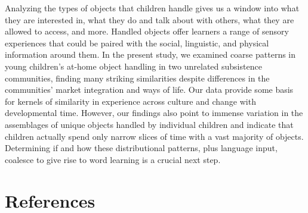 \documentclass[10pt, letterpaper]{article}
\begin{document}
Analyzing the types of objects that children handle gives us a window
into what they are interested in, what they do and talk about with
others, what they are allowed to access, and more. Handled objects offer
learners a range of sensory experiences that could be paired with the
social, linguistic, and physical information around them. In the present
study, we examined coarse patterns in young children's at-home object
handling in two unrelated subsistence communities, finding many striking
similarities despite differences in the communities' market integration
and ways of life. Our data provide some basis for kernels of similarity
in experience across culture and change with developmental time.
However, our findings also point to immense variation in the assemblages
of unique objects handled by individual children and indicate that
children actually spend only narrow slices of time with a vast majority
of objects. Determining if and how these distributional patterns, plus
language input, coalesce to give rise to word learning is a crucial next
step.

\hypertarget{references}{%
\section{References}\label{references}}

\setlength{\parindent}{-0.1in} 
\setlength{\leftskip}{0.125in}

\noindent
\end{document}
